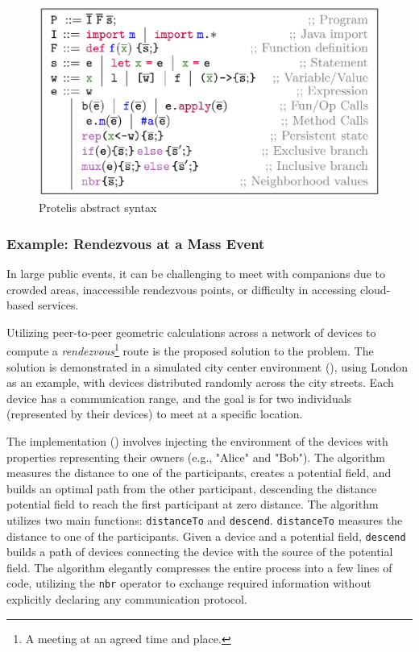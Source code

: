 \begin{figure}
    \centering
    \includegraphics[width=.8\linewidth]{figures/protelis-syntax.png}
    \caption{Protelis abstract syntax}
    \label{fig:protelis-syntax}
\end{figure}

\subsubsection{Example: Rendezvous at a Mass Event}

In large public events, it can be challenging to meet with companions due to crowded areas, inaccessible rendezvous points, or difficulty in accessing cloud-based services.

Utilizing peer-to-peer geometric calculations across a network of devices to compute a \textit{rendezvous}\footnote{A meeting at an agreed time and place.} route is the proposed solution to the problem. The solution is demonstrated in a simulated city center environment (), using London as an example, with devices distributed randomly across the city streets. Each device has a communication range, and the goal is for two individuals (represented by their devices) to meet at a specific location.

The implementation () involves injecting the environment of the devices with properties representing their owners (e.g., "Alice" and "Bob"). The algorithm measures the distance to one of the participants, creates a potential field, and builds an optimal path from the other participant, descending the distance potential field to reach the first participant at zero distance. The algorithm utilizes two main functions: \texttt{distanceTo} and \texttt{descend}. \texttt{distanceTo} measures the distance to one of the participants. Given a device and a potential field, \texttt{descend} builds a path of devices connecting the device with the source of the potential field. The algorithm elegantly compresses the entire process into a few lines of code, utilizing the \texttt{nbr} operator to exchange required information without explicitly declaring any communication protocol.

